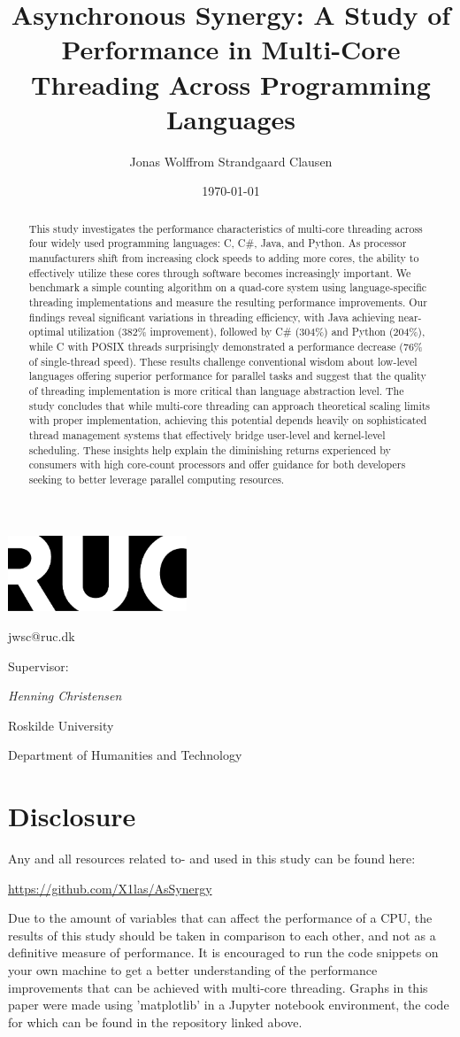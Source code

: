 \documentclass[12pt,a4paper]{article}
\title{Asynchronous Synergy: A Study of Performance in Multi-Core Threading Across Programming Languages}
\author{Jonas Wolffrom Strandgaard Clausen}
\date{\today}
\makeatletter
\renewcommand{\maketitle}{
  \begin{titlepage}
    \centering
    \vspace*{1cm}
    
    \includegraphics[width=0.4\textwidth]{ruc_logo.png}\\[2cm]
    
    {\LARGE\bfseries\thetitle\par}
    
    \vspace{1.5cm}
    
    {\Large\theauthor\par}
    {\large jwsc@ruc.dk\par}
    \vspace{1cm}
    {\large Supervisor: \par}
    {\large\textit{Henning Christensen}\par}   
    \vspace{1cm}
    
    {\large\thedate\par}
    \vfill
    
    {\large Roskilde University\par}
    {\large Department of Humanities and Technology\par}
    \vspace{0.5cm}
  \end{titlepage}
}
\makeatother
\begin{document}
\maketitle
\newpage

\begin{abstract}
This study investigates the performance characteristics of multi-core threading across four widely used programming languages: C, C\#, Java, and Python. As processor manufacturers shift from increasing clock speeds to adding more cores, the ability to effectively utilize these cores through software becomes increasingly important. We benchmark a simple counting algorithm on a quad-core system using language-specific threading implementations and measure the resulting performance improvements. Our findings reveal significant variations in threading efficiency, with Java achieving near-optimal utilization (382\% improvement), followed by C\# (304\%) and Python (204\%), while C with POSIX threads surprisingly demonstrated a performance decrease (76\% of single-thread speed). These results challenge conventional wisdom about low-level languages offering superior performance for parallel tasks and suggest that the quality of threading implementation is more critical than language abstraction level. The study concludes that while multi-core threading can approach theoretical scaling limits with proper implementation, achieving this potential depends heavily on sophisticated thread management systems that effectively bridge user-level and kernel-level scheduling. These insights help explain the diminishing returns experienced by consumers with high core-count processors and offer guidance for both developers seeking to better leverage parallel computing resources.
\end{abstract}
\newpage

\tableofcontents
\newpage

\section{Disclosure}

Any and all resources related to- and used in this study can be found here:

\begin{center}
    \href{https://github.com/X1las/AsSynergy}{https://github.com/X1las/AsSynergy}
\end{center}

Due to the amount of variables that can affect the performance of a CPU, the results of this study should be taken in comparison to each other, and not as a definitive measure of performance. It is encouraged to run the code snippets on your own machine to get a better understanding of the performance improvements that can be achieved with multi-core threading. Graphs in this paper were made using 'matplotlib' in a Jupyter notebook environment, the code for which can be found in the repository linked above.
\end{document}
